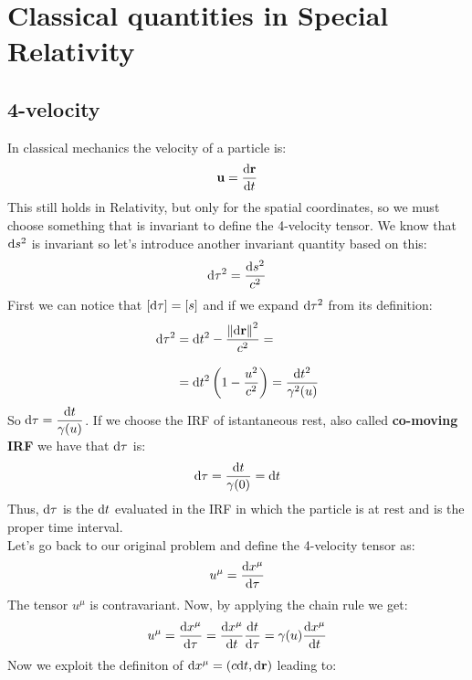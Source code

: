 \chapter[Classical SR Quantities]{Classical quantities in Special Relativity}
\section{4-velocity}
In classical mechanics the velocity of a particle is:
\begin{equation}
  \vec{u} = \dv{\vec{r}}{t}
\end{equation}
This still holds in Relativity, but only for the spatial coordinates, so we must choose something that is invariant to define the 4-velocity tensor.
We know that $\mathrm{d}s^2$ is invariant so let's introduce another invariant quantity based on this:
\begin{equation}
  \mathrm{d}\tau^2 = \dfrac{\mathrm{d}s^2}{c^2}
\end{equation}
First we can notice that $\left[\mathrm{d}\tau\right] = \left[s\right]$ and if we expand $\mathrm{d}\tau^2$ from its definition:
\begin{equation}
  \begin{split}
    \mathrm{d}\tau^2 &= \mathrm{d}t^2 - \dfrac{\norm{\mathrm{d}\vb{r}}^2}{c^2} =\\[8pt]
    &= \mathrm{d}t^2 \left(1 - \dfrac{u^2}{c^2}\right) = \dfrac{\mathrm{d}t^2}{\gamma^2(u)}
  \end{split}
\end{equation}
So $\mathrm{d}\tau = \dfrac{\mathrm{d}t}{\gamma(u)}$. If we choose the IRF of istantaneous rest, also called \textbf{co-moving IRF} we have that $\mathrm{d}\tau$ is:
\begin{equation}
  \mathrm{d}\tau = \dfrac{\mathrm{d}t}{\gamma(0)} = \mathrm{d}t
\end{equation}
Thus, $\mathrm{d}\tau$ is the $\mathrm{d}t$ evaluated in the IRF in which the particle is at rest and is the proper time interval.\\
Let's go back to our original problem and define the 4-velocity tensor as:
\begin{equation}
  u^{\mu} = \dv{x^{\mu}}{\tau}
\end{equation}
The tensor $u^{\mu}$ is contravariant. Now, by applying the chain rule we get:
\begin{equation}
  u^{\mu} = \dv{x^{\mu}}{\tau} = \dv{x^{\mu}}{t} \dv{t}{\tau} =\gamma(u) \dv{x^{\mu}}{t}
\end{equation}
Now we exploit the definiton of $\mathrm{d}x^{\mu} = \left(c\mathrm{d}t, \mathrm{d}\vb{r}\right)$ leading to:
